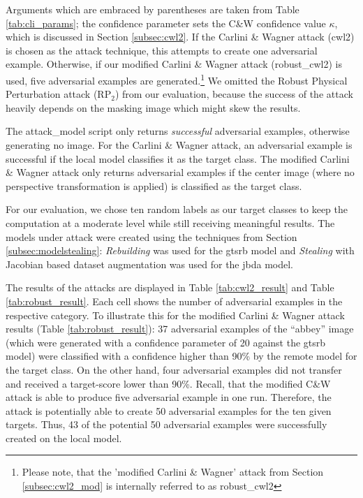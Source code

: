 Arguments which are embraced by parentheses are taken from Table \ref{tab:cli_params}; the confidence parameter sets the C\&W confidence value $\kappa$, which is discussed in Section \ref{subsec:cwl2}.
If the Carlini \& Wagner attack (cwl2) is chosen as the attack technique, this attempts to create one adversarial example.
Otherwise, if our modified Carlini \& Wagner attack (robust\_cwl2) is used, five adversarial examples are generated.\footnote{Please note, that the 'modified Carlini \& Wagner' attack from Section \ref{subsec:cwl2_mod} is internally referred to as robust\_cwl2} We omitted the Robust Physical Perturbation attack (RP$_2$) from our evaluation, because the success of the attack heavily depends on the masking image which might skew the results.

The attack\_model script only returns \emph{successful} adversarial examples, otherwise generating no image. 
For the Carlini \& Wagner attack, an adversarial example is successful if the local model classifies it as the target class. 
The modified Carlini \& Wagner attack only returns adversarial examples if the center image (where no perspective transformation is applied) is classified as the target class.

For our evaluation, we chose ten random labels as our target classes to keep the computation at a moderate level while still receiving meaningful results. 
The models under attack were created using the techniques from Section \ref{subsec:modelstealing}: \emph{Rebuilding} was used for the gtsrb model and \emph{Stealing} with Jacobian based dataset augmentation was used for the jbda model. 

The results of the attacks are displayed in Table \ref{tab:cwl2_result} and Table \ref{tab:robust_result}. 
Each cell shows the number of adversarial examples in the respective category. 
To illustrate this for the modified Carlini \& Wagner attack results (Table \ref{tab:robust_result}): 37 adversarial examples of the \enquote{abbey} image (which were generated with a confidence parameter of 20 against the gtsrb model) were classified with a confidence higher than 90\% by the remote model for the target class. 
On the other hand, four adversarial examples did not transfer and received a target-score lower than 90\%. 
Recall, that the modified C\&W attack is able to produce five adversarial example in one run. 
Therefore, the attack is potentially able to create 50 adversarial examples for the ten given targets. 
Thus, 43 of the potential 50 adversarial examples were successfully created on the local model.

